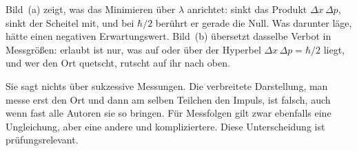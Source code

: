 Bild~(a) zeigt, was das Minimieren über $\lambda$ anrichtet: sinkt das Produkt
$\Delta x\,\Delta p$, sinkt der Scheitel mit, und bei $\hbar/2$ berührt er
gerade die Null. Was darunter läge, hätte einen negativen Erwartungswert.
Bild~(b) übersetzt dasselbe Verbot in Messgrößen: erlaubt ist nur, was auf
oder über der Hyperbel $\Delta x\,\Delta p=\hbar/2$ liegt, und wer den Ort
quetscht, rutscht auf ihr nach oben.

\begin{merksatz}
Sie sagt nichts über sukzessive Messungen. Die verbreitete Darstellung, man messe erst den Ort und dann am selben Teilchen den Impuls, ist falsch, auch wenn fast alle Autoren sie so bringen. Für Messfolgen gilt zwar ebenfalls eine Ungleichung, aber eine andere und kompliziertere. Diese Unterscheidung ist prüfungsrelevant.
\end{merksatz}
